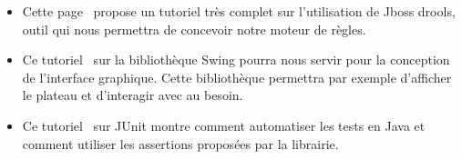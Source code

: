 \begin{itemize}
		\item Cette page~\cite{ref6} propose un tutoriel très complet sur l'utilisation de Jboss drools, outil qui nous permettra de concevoir notre moteur de règles.
		\\[0.7\baselineskip]

		\item Ce tutoriel~\cite{ref7} sur la bibliothèque Swing pourra nous servir pour la conception de l'interface graphique. Cette bibliothèque 
		permettra par exemple d'afficher le plateau et d'interagir avec au besoin.
		\\[0.7\baselineskip]

		\item Ce tutoriel~\cite{ref8} sur JUnit montre comment automatiser les tests en Java et comment utiliser les assertions proposées par la librairie. 
		\\[0.7\baselineskip]

	\end{itemize}

